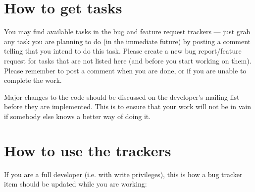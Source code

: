 \documentclass[12pt]{book}
\begin{document}
\hypertarget{How to get tasks}{\section{How to get tasks}}

You may find available tasks in the bug and feature request trackers
--- just grab any task you are planning to do (in the immediate
future) by posting a comment telling that you intend to do this task.
Please create a new bug report/feature request for tasks that are not
listed here (and before you start working on them).  Please remember
to post a comment when you are done, or if you are unable to complete
the work.

Major changes to the code should be discussed on the developer's
mailing list before they are implemented.  This is to ensure that your
work will not be in vain if somebody else knows a better way of doing
it.


\hypertarget{How to use the trackers}{\section{How to use the trackers}}

If you are a full developer (i.e. with write privileges), this is how
a bug tracker item should be updated while you are working:
\end{document}
